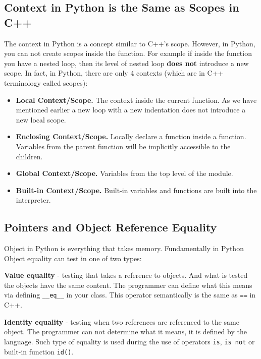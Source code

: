 \documentclass[
]{article}
\begin{document}
\hypertarget{context-in-python-is-the-same-as-scopes-in-c}{%
\subsection{Context in Python is the Same as Scopes in
C++}\label{context-in-python-is-the-same-as-scopes-in-c}}

The context in Python is a concept similar to C++'s scope. However, in
Python, you can not create scopes inside the function. For example if
inside the function you have a nested loop, then its level of nested
loop \textbf{does not} introduce a new scope. In fact, in Python, there
are only 4 contexts (which are in C++ terminology called scopes):

\begin{itemize}
\item
  \textbf{Local Context/Scope.} The context inside the current function.
  As we have mentioned earlier a new loop with a new indentation does
  not introduce a new local scope.
\item
  \textbf{Enclosing Context/Scope.} Locally declare a function inside a
  function. Variables from the parent function will be implicitly
  accessible to the children.
\item
  \textbf{Global Context/Scope.} Variables from the top level of the
  module.
\item
  \textbf{Built-in Context/Scope.} Built-in variables and functions are
  built into the interpreter.
\end{itemize}

\hypertarget{pointers-and-object-reference-equality}{%
\subsection{Pointers and Object Reference
Equality}\label{pointers-and-object-reference-equality}}

Object in Python is everything that takes memory. Fundamentally in
Python Object equality can test in one of two types:

\textbf{Value equality} - testing that takes a reference to objects. And
what is tested the objects have the same content. The programmer can
define what this means via defining \texttt{\_\_eq\_\_} in your class.
This operator semantically is the same as \texttt{==} in C++.

\textbf{Identity equality} - testing when two references are referenced
to the same object. The programmer can not determine what it means, it
is defined by the language. Such type of equality is used during the use
of operators \texttt{is}, \texttt{is\ not} or built-in function
\texttt{id()}.
\end{document}
